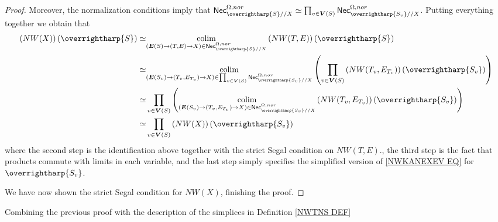 \documentclass[a4paper,10pt
,draft
]{article}%
\numberwithin{equation}{section}
\numberwithin{figure}{section}
\theoremstyle{definition} %
\newcommand{\vect}[1]{\text{\overrightharp{\ensuremath{#1}}}}
\DeclareMathOperator{\colim}{colim}%
\newcommand{\1}{\ensuremath{\mathbbm 1}}%
\begin{document}
\begin{proof}
Moreover, the normalization conditions imply that
$\mathsf{Nec}_{\vect{S}//X}^{\Omega,nor} 
\simeq
\prod_{v \in \boldsymbol{V}(S)}
\mathsf{Nec}_{\vect{S_v}//X}^{\Omega,nor}$.
Putting everything together we obtain that
\begin{equation}
\begin{aligned}
\left(NW(X)\right)(\vect{S}) 
	\simeq &
	\underset{(\boldsymbol{E}(S) \to (T,E) \to X)
	\in \mathsf{Nec}^{\Omega,nor}_{\vect{S}//X}}{\colim}
\left(NW(T,E)\right)(\vect{S})
\\
	\simeq &
\underset{(\boldsymbol{E}(S_v) \to (T_v,E_{T_v}) \to X)
	\in 
	\prod_{v \in \boldsymbol{V}(S)} \mathsf{Nec}^{\Omega,nor}_{\vect{S_v}//X}}{\colim}
	\left(\prod_{v \in \boldsymbol{V}(S)}
	\left(NW(T_v,E_{T_v})\right)(\vect{S_v})\right)
\\
	\simeq &
	\prod_{v \in \boldsymbol{V}(S)}
	\left(
	\underset{(\boldsymbol{E}(S_v) \to (T_v,E_{T_v}) \to X)
	\in \mathsf{Nec}^{\Omega,nor}_{\vect{S_v}//X}}{\colim}
	\left(NW(T_v,E_{T_v})\right)(\vect{S_v})
	\right)
\\
	\simeq &
	\prod_{v \in \boldsymbol{V}(S)} 
	\left(NW(X)\right)(\vect{S_v}) 
\end{aligned}
\end{equation}
where the second step is the identification above together with 
the strict Segal condition on 
$NW(T,E)$.,
the third step is the fact that products commute with limits in each variable, and the last step simply specifies
the simplified version of \eqref{NWKANEXEV EQ}
for $\vect{S_v}$.

We have now shown the 
strict Segal condition for $NW(X)$, 
finishing the proof.
\end{proof}


Combining the previous proof with the description of the simplices 
in Definition \ref{NWTNS DEF}
\end{document}
